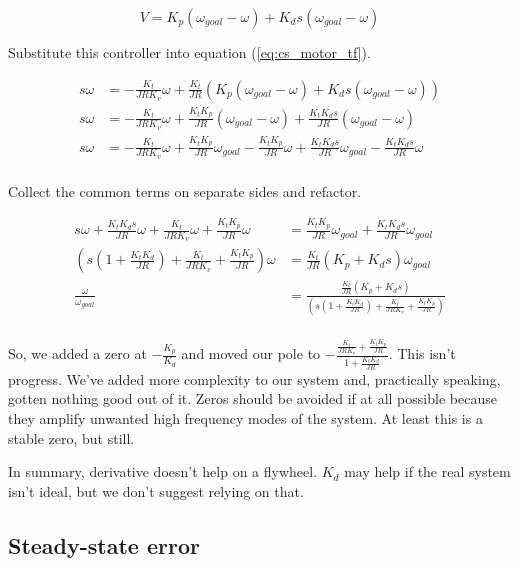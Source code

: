 \begin{equation*}
  V = K_p (\omega_{goal} - \omega) + K_d s (\omega_{goal} - \omega)
\end{equation*}

Substitute this controller into equation (\ref{eq:cs_motor_tf}).

\begin{align*}
  s \omega &= -\frac{K_t}{JRK_v} \omega + \frac{K_t}{JR}
    \left(K_p (\omega_{goal} - \omega) + K_d s (\omega_{goal} - \omega)\right)
    \\
  s \omega &= -\frac{K_t}{JRK_v} \omega + \frac{K_t K_p}{JR}
    (\omega_{goal} - \omega) + \frac{K_t K_d s}{JR} (\omega_{goal} - \omega) \\
  s \omega &= -\frac{K_t}{JRK_v} \omega + \frac{K_t K_p}{JR} \omega_{goal} -
    \frac{K_t K_p}{JR} \omega + \frac{K_t K_d s}{JR} \omega_{goal} -
    \frac{K_t K_d s}{JR} \omega \\
\end{align*}

Collect the common terms on separate sides and refactor.

\begin{align*}
  s \omega + \frac{K_t K_d s}{JR} \omega + \frac{K_t}{JRK_v} \omega +
    \frac{K_t K_p}{JR} \omega &= \frac{K_t K_p}{JR} \omega_{goal} +
    \frac{K_t K_d s}{JR} \omega_{goal} \\
  \left(s \left(1 + \frac{K_t K_d}{JR}\right) + \frac{K_t}{JRK_v} +
    \frac{K_t K_p}{JR}\right) \omega &= \frac{K_t}{JR}
    \left(K_p + K_d s\right) \omega_{goal} \\
  \frac{\omega}{\omega_{goal}} &= \frac{\frac{K_t}{JR}
    \left(K_p + K_d s\right)}{\left(s \left(1 + \frac{K_t K_d}{JR}\right) +
    \frac{K_t}{JRK_v} + \frac{K_t K_p}{JR}\right)} \\
\end{align*}

So, we added a zero at $-\frac{K_p}{K_d}$ and moved our pole to
$-\frac{\frac{K_t}{JRK_v} + \frac{K_t K_p}{JR}}{1 + \frac{K_t K_d}{JR}}$. This
isn't progress. We've added more complexity to our system and, practically
speaking, gotten nothing good out of it. Zeros should be avoided if at all
possible because they amplify unwanted high frequency modes of the system. At
least this is a stable zero, but still.

In summary, derivative doesn't help on a flywheel. $K_d$ may help if the real
system isn't ideal, but we don't suggest relying on that.

\subsection{Steady-state error}

